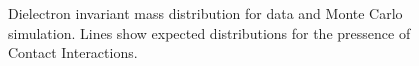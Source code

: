 



\begin{figure}[h!p]
\centering
\caption{Dielectron invariant mass distribution for data and Monte Carlo simulation. Lines show expected distributions for the pressence of Contact Interactions.}
\label{fig:CIinvMass}
\end{figure}

